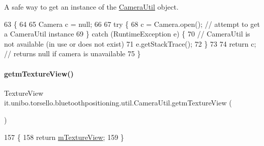 A safe way to get an instance of the \hyperlink{classit_1_1unibo_1_1torsello_1_1bluetoothpositioning_1_1util_1_1CameraUtil}{Camera\+Util} object. 
\begin{DoxyCode}
63                                               \{
64 
65         Camera c = null;
66 
67         \textcolor{keywordflow}{try} \{
68             c = Camera.open(); \textcolor{comment}{// attempt to get a CameraUtil instance}
69         \} \textcolor{keywordflow}{catch} (RuntimeException e) \{
70             \textcolor{comment}{// CameraUtil is not available (in use or does not exist)}
71             e.getStackTrace();
72         \}
73 
74         \textcolor{keywordflow}{return} c; \textcolor{comment}{// returns null if camera is unavailable}
75     \}
\end{DoxyCode}
\hypertarget{classit_1_1unibo_1_1torsello_1_1bluetoothpositioning_1_1util_1_1CameraUtil_a5465cd771c9607dce53409cba1e4e1d9_a5465cd771c9607dce53409cba1e4e1d9}{}\label{classit_1_1unibo_1_1torsello_1_1bluetoothpositioning_1_1util_1_1CameraUtil_a5465cd771c9607dce53409cba1e4e1d9_a5465cd771c9607dce53409cba1e4e1d9} 
\paragraph{\texorpdfstring{getm\+Texture\+View()}{getmTextureView()}}
{\footnotesize\ttfamily Texture\+View it.\+unibo.\+torsello.\+bluetoothpositioning.\+util.\+Camera\+Util.\+getm\+Texture\+View (\begin{DoxyParamCaption}{ }\end{DoxyParamCaption})}


\begin{DoxyCode}
157                                          \{
158         \textcolor{keywordflow}{return} \hyperlink{classit_1_1unibo_1_1torsello_1_1bluetoothpositioning_1_1util_1_1CameraUtil_a4fb9e02d00c0a61cb6b8992e085cf374_a4fb9e02d00c0a61cb6b8992e085cf374}{mTextureView};
159     \}
\end{DoxyCode}
\hypertarget{classit_1_1unibo_1_1torsello_1_1bluetoothpositioning_1_1util_1_1CameraUtil_acef4209a5ff8034ddd3adab34761fe98_acef4209a5ff8034ddd3adab34761fe98}{}\label{classit_1_1unibo_1_1torsello_1_1bluetoothpositioning_1_1util_1_1CameraUtil_acef4209a5ff8034ddd3adab34761fe98_acef4209a5ff8034ddd3adab34761fe98} 
